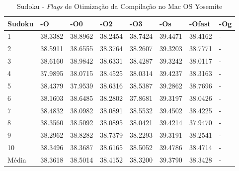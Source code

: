 \begin{apendicesenv}
\begin{table}[!ht]
\centering
\tiny
\caption{Sudoku - \textit{Flags} de Otimização da Compilação no Mac OS Yosemite}
\label{tab:otimizacao_compilacao:mac:sudoku}
\begin{tabular}{llllllll}
\textbf{Sudoku}         & \textbf{-O}  & \textbf{-O0}   & \textbf{-O2} & \textbf{-O3} & \textbf{-Os} & \textbf{-Ofast} & \textbf{-Og} \\ \toprule
1                       & 38.3382      & 38.8962        & 38.2454      & 38.7424      & 39.4471      & 38.4162         &  -           \\ 
2                       & 38.5911      & 38.6555        & 38.3764      & 38.2607      & 39.3203      & 38.7771         &  -           \\ 
3                       & 38.6160      & 38.9842        & 38.6331      & 38.4287      & 39.3242      & 38.0117         &  -           \\ 
4                       & 37.9895      & 38.0715        & 38.4525      & 38.0314      & 39.4237      & 38.3163         &  -           \\ 
5                       & 38.4379      & 37.9539        & 38.6316      & 38.5387      & 39.2862      & 38.7696         &  -           \\ 
6                       & 38.1603      & 38.6485        & 38.2802      & 37.8681      & 39.3197      & 38.0426         &  -           \\ 
7                       & 38.4832      & 38.0982        & 38.0891      & 38.5532      & 39.4502      & 38.4225         &  -           \\ 
8                       & 38.3560      & 38.5092        & 38.0895      & 38.0421      & 39.4214      & 37.9470         &  -           \\ 
9                       & 38.2962      & 38.8282        & 38.7379      & 38.2293      & 39.3191      & 38.2541         &  -           \\ 
10                      & 38.3496      & 38.3687        & 38.6165      & 38.5052      & 39.4786      & 38.4714         &  -           \\ \bottomrule
Média                   & 38.3618      & 38.5014        & 38.4152      & 38.3200      & 39.3790      & 38.3428         &  -           \\ 
\end{tabular}
\end{table}


\end{apendicesenv}
